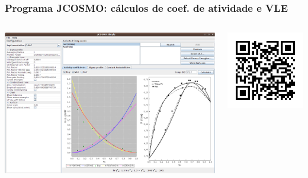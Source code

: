 \documentclass[aspectratio=169]{beamer}
\begin{document}
\begin{frame}
  \frametitle{Programa JCOSMO: cálculos de coef. de atividade e VLE}
	\begin{columns}[t]
		\begin{center}
			\includegraphics[width=1\textwidth]{img/jcosmo1}
		\end{center}
	
		\begin{center}
			\includegraphics[width=1\textwidth]{img/jcosmo_qr}
		\end{center}
	\end{columns}
\end{frame}
\end{document}

